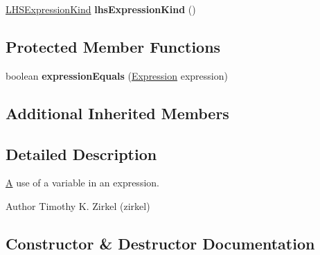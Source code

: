 \begin{DoxyCompactItemize}
\hypertarget{classedu_1_1udel_1_1cis_1_1vsl_1_1civl_1_1model_1_1common_1_1expression_1_1CommonVariableExpression_ababe0a32f71a095284a29bfbeebcd840}{}\hyperlink{enumedu_1_1udel_1_1cis_1_1vsl_1_1civl_1_1model_1_1IF_1_1expression_1_1LHSExpression_1_1LHSExpressionKind}{L\+H\+S\+Expression\+Kind} {\bfseries lhs\+Expression\+Kind} ()\label{classedu_1_1udel_1_1cis_1_1vsl_1_1civl_1_1model_1_1common_1_1expression_1_1CommonVariableExpression_ababe0a32f71a095284a29bfbeebcd840}

\end{DoxyCompactItemize}
\subsection*{Protected Member Functions}
\begin{DoxyCompactItemize}
\item 
\hypertarget{classedu_1_1udel_1_1cis_1_1vsl_1_1civl_1_1model_1_1common_1_1expression_1_1CommonVariableExpression_a22392ab681bf94999f4d1b3b3944420f}{}boolean {\bfseries expression\+Equals} (\hyperlink{interfaceedu_1_1udel_1_1cis_1_1vsl_1_1civl_1_1model_1_1IF_1_1expression_1_1Expression}{Expression} expression)\label{classedu_1_1udel_1_1cis_1_1vsl_1_1civl_1_1model_1_1common_1_1expression_1_1CommonVariableExpression_a22392ab681bf94999f4d1b3b3944420f}

\end{DoxyCompactItemize}
\subsection*{Additional Inherited Members}


\subsection{Detailed Description}
\hyperlink{structA}{A} use of a variable in an expression. 

\begin{DoxyAuthor}{Author}
Timothy K. Zirkel (zirkel) 
\end{DoxyAuthor}


\subsection{Constructor \& Destructor Documentation}
\hypertarget{classedu_1_1udel_1_1cis_1_1vsl_1_1civl_1_1model_1_1common_1_1expression_1_1CommonVariableExpression_a9c515ef459e58aa63970da1a416c89ca}{}

